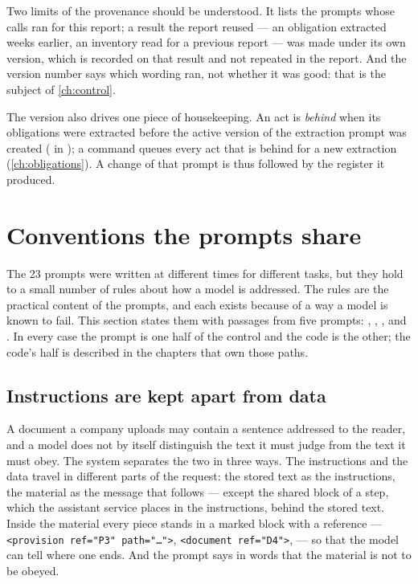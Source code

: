 Two limits of the provenance should be understood. It lists the prompts whose calls ran for
this report; a result the report reused — an obligation extracted weeks earlier, an inventory
read for a previous report — was made under its own version, which is recorded on that result
and not repeated in the report. And the version number says which wording ran, not whether it
was good: that is the subject of \cref{ch:control}.

The version also drives one piece of housekeeping. An act is \emph{behind} when its obligations
were extracted before the active version of the extraction prompt was created (
in ); a command queues every act that is behind for a new
extraction (\cref{ch:obligations}). A change of that prompt is thus followed by the register it
produced.


\section{Conventions the prompts share}\label{sec:prompts:conventions}

The 23 prompts were written at different times for different tasks, but they hold to a small
number of rules about how a model is addressed. The rules are the practical content of the
prompts, and each exists because of a way a model is known to fail. This section states them
with passages from five prompts: , ,
,  and
. In every case the prompt is one half of the control and the code is
the other; the code's half is described in the chapters that own those paths.

\subsection{Instructions are kept apart from data}

A document a company uploads may contain a sentence addressed to the reader, and a model does
not by itself distinguish the text it must judge from the text it must obey. The system
separates the two in three ways. The instructions and the data travel in different parts of
the request: the stored text as the instructions, the material as the message that follows —
except the shared block of a step, which the assistant service places in the instructions,
behind the stored text.
Inside the material every piece stands in a marked block with a reference —
\texttt{<provision ref="P3" path="…">}, \texttt{<document ref="D4">},  — so
that the model can tell where one ends. And the prompt says in words that the material is not
to be obeyed.

